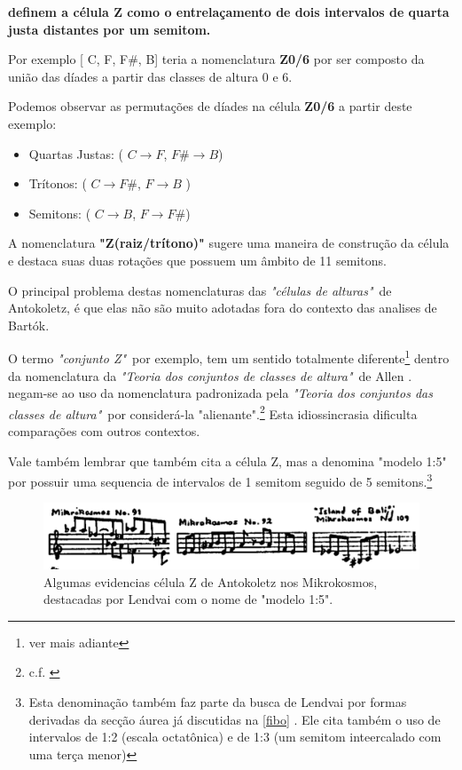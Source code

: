 \documentclass[
	12pt,				%
	openright,			%
	twoside,			%
	a4paper,			%
	english,			%
	french,				%
	spanish,			%
	brazil				%
	]{abntex2}
\begin{document}
 \textbf{definem a célula Z como o entrelaçamento de dois intervalos de quarta justa distantes por um semitom.} 

Por exemplo [ C, F, F\#, B] teria a nomenclatura \textbf{Z0/6} por ser composto da união das díades a partir das classes de altura 0 e 6. 

Podemos observar as permutações de díades na célula \textbf{Z0/6} a partir deste exemplo:

\begin{itemize}
\item Quartas Justas: ( $C \rightarrow F$, $F\# \rightarrow B$) 

\item Trítonos: ( $C \rightarrow F\#$, $F \rightarrow B$ )

\item Semitons: ( $C \rightarrow B$, $F \rightarrow F\#$)
\end{itemize}


A nomenclatura \textbf{"Z(raiz/trítono)"} sugere uma maneira de construção da célula e destaca suas duas rotações que possuem um âmbito de 11 semitons. 

O principal problema destas nomenclaturas das \textit{"células de alturas"}\ de Antokoletz, é que elas não são muito adotadas fora do contexto das analises de Bartók.

O termo \textit{"conjunto Z"}\, por exemplo, tem um sentido totalmente diferente\footnote{ver mais adiante} dentro da nomenclatura da  \textit{"Teoria dos conjuntos de classes de altura"}\ de Allen .  negam-se ao uso da nomenclatura padronizada pela \textit{"Teoria dos conjuntos das classes de altura"}\ por considerá-la "alienante".\footnote{c.f. \cite[ p.xiii]{susanni_antokoletz2012music}} Esta idiossincrasia dificulta comparações com outros contextos.

Vale também lembrar que \cite[ p.51]{lendvai1971bela} também cita a célula Z, mas a denomina "modelo 1:5" por possuir uma sequencia de intervalos de 1 semitom seguido de 5 semitons.\footnote{Esta denominação também faz parte da busca de Lendvai por formas derivadas da secção áurea já discutidas na \autoref{fibo} . Ele cita também o uso de intervalos de 1:2 (escala octatônica) e de 1:3 (um semitom inteercalado com uma terça menor) } 

\begin{figure}[!h]
	\caption{\label{fig_grafico}Algumas evidencias célula Z de Antokoletz nos Mikrokosmos, destacadas por Lendvai com o nome de "modelo 1:5". }
	\begin{center}
	    \includegraphics[scale=0.4]{intervalar/Lendvai_p52_ZCell.png}
	\end{center}
\end{figure}
\end{document}
